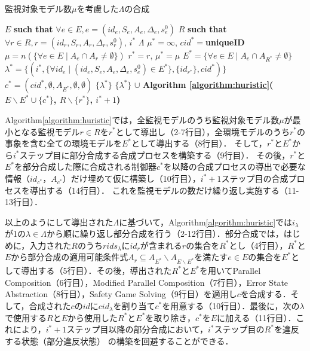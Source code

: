\begin{algorithm}[h]
\caption{監視対象モデル数$\mu$を考慮した$\Lambda$の合成}
\label{algorithm:huristic}
\begin{algorithmic}[1]
\renewcommand{\algorithmicrequire}{\textbf{Input:}}
\renewcommand{\algorithmicensure}{\textbf{Output:}}
\REQUIRE $E$ {\bf such that} $\forall e \in E, e = (id_{e}, S_{e}, A_{e}, \Delta_{e}, s^0_{e})$
\REQUIRE $R$ {\bf such that} $\forall r \in R, r = (id_{r}, S_{r}, A_{r}, \Delta_{r}, s^0_{r})$, $i^*$
\ENSURE  $\Lambda$
\STATE $\mu^*= \infty$,\;\; $cid^* = ${\bf uniqueID}
    \STATE $\mu = n(\{\forall e \in E \mid A_e \cap A_r \neq \emptyset\})$
    \IF{$\mu < \mu^*$}
        \STATE $r^* = r$,\;\; $\mu^* = \mu$
    \ENDIF
\ENDFOR
\STATE $E^* = \{\forall e \in E \mid A_{e} \cap A_{R^*} \neq \emptyset\}$
\STATE $\lambda^* = \{(i^*, \{\forall id_{e} \mid (id_{e}, S_{e}, A_{e}, \Delta_{e}, s^0_{e}) \in E^*\}, \{id_{r^*}\}, cid^*)\}$
\STATE $c^* = (cid^*, \emptyset, A_{E^*}, \emptyset, \emptyset)$
 $\{\lambda^*\}$
\ENDIF
{} $\{\lambda^*\}$ $\cup$ {\bf Algorithm \ref{algorithm:huristic}($E \backslash E^* \cup \{c^*\}$, $R \backslash \{r^*\}$, $i^*+1$)}
\end{algorithmic}
\end{algorithm}

Algorithm\ref{algorithm:huristic}では，全監視モデルのうち監視対象モデル数$\mu$が最小となる監視モデル$r \in R$を$r^*$として導出し（2-7行目），全環境モデルのうち$r^*$の事象を含む全ての環境モデルを$E^*$として導出する（8行目）．
そして，$r^*$と$E^*$から$i^*$ステップ目に部分合成する合成プロセスを構築する（9行目）．
その後，$r^*$と$E^*$を部分合成した際に合成される制御器$c^*$を以降の合成プロセスの導出で必要な情報（$id_{c^*}$，$A_{c^*}$）だけ埋めて仮に構築し（10行目），$i^*+1$ステップ目の合成プロセスを導出する（14行目）．
これを監視モデルの数だけ繰り返し実施する（11-13行目）．

以上のようにして導出された$\Lambda$に基づいて，Algorithm\ref{algorithm:huristic}では$i_{\lambda}$が1の$\lambda \in \Lambda$から順に繰り返し部分合成を行う（2-12行目）．部分合成では，はじめに，入力された$R$のうち$rids_{\lambda}$に$id_{r}$が含まれる$r$の集合を$R^*$とし（4行目），$R^*$と$E$から部分合成の適用可能条件式$A_{r} \subseteq A_{E^*} \backslash A_{E \backslash E^*}$を満たす$e \in E$の集合を$E^*$として導出する（5行目）．その後，導出された$R^*$と$E^*$を用いてParallel Composition（6行目），Modified Parallel Composition（7行目），Error State Abstraction（8行目），Safety Game Solving（9行目）を適用し$c$を合成する．そして，合成された$c$の$id$に$cid_{\lambda}$を割り当て$c^*$を用意する（10行目）．最後に，次の$\lambda$で使用する$R$と$E$から使用した$R^*$と$E^*$を取り除き，$c^*$を$E$に加える（11行目）．これにより，$i^*+1$ステップ目以降の部分合成において，$i^*$ステップ目の$R^*$を違反する状態（部分違反状態）
の構築を回避することができる．

